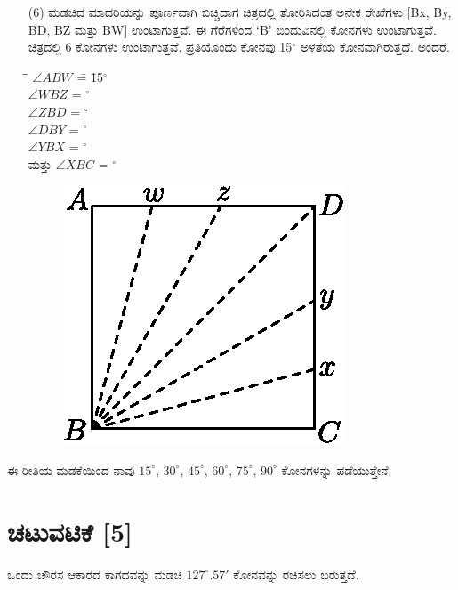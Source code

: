 \begin{itemize}
\item[(6)] ಮಡಚಿದ ಮಾದರಿಯನ್ನು ಪೂರ್ಣವಾಗಿ ಬಿಚ್ಚಿದಾಗ ಚಿತ್ರದಲ್ಲಿ ತೋರಿಸಿದಂತ ಅನೇಕ ರೇಖೆಗಳು [Bx, By, BD, BZ ಮತ್ತು  BW] ಉಂಟಾಗುತ್ತವೆ. ಈ ಗೆರೆಗಳಿಂದ `B' ಬಿಂದುವಿನಲ್ಲಿ ಕೋನಗಳು ಉಂಟಾಗುತ್ತವೆ. ಚಿತ್ರದಲ್ಲಿ 6 ಕೋನಗಳು ಉಂಟಾಗುತ್ತವೆ. ಪ್ರತಿಯೊಂದು ಕೋನವು  15$^\circ$ ಅಳತೆಯ ಕೋನವಾಗಿರುತ್ತದೆ. ಅಂದರೆ. 
\begin{tabbing}
\= \quad \quad \= $\angle  ABW$ \= = \= 15$^\circ$\\
\> \> $\angle WBZ$ \> = $^\circ$\\
\> \> $\angle  ZBD$ \> = $^\circ$\\
\> \> $\angle  DBY$ \> = $^\circ$\\
\> \> $\angle  YBX$ \> = $^\circ$ \\
ಮತ್ತು \> \> $\angle  XBC$ \> = $^\circ$
\end{tabbing}
\begin{figure}[H]
\centering
\includegraphics[scale=.98]{src/figure/chap1/fig1-10f.eps}
\end{figure}
\end{itemize}

ಈ ರೀತಿಯ ಮಡಕೆಯಿಂದ ನಾವು $15^\circ$, $30^\circ$, $45^\circ$, $60^\circ$, $75^\circ$, $90^\circ$ ಕೋನಗಳನ್ನು ಪಡೆಯುತ್ತೇನೆ. 

\section*{ಚಟುವಟಿಕೆ [5]} 
ಒಂದು ಚೌರಸ ಆಕಾರದ ಕಾಗದವನ್ನು ಮಡಚಿ $127^\circ.57'$ ಕೋನವನ್ನು ರಚಿಸಲು ಬರುತ್ತದೆ. 

